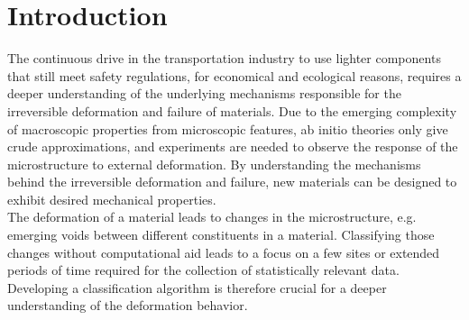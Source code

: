\chapter{Introduction}

\setcounter{page}{1}

The continuous drive in the transportation industry to use lighter components that still meet safety regulations, for economical and ecological reasons, requires a deeper understanding of the underlying mechanisms responsible for the irreversible deformation and failure of materials. Due to the emerging complexity of macroscopic properties from microscopic features, ab initio theories only give crude approximations, and experiments are needed to observe the response of the microstructure to external deformation. By understanding the mechanisms behind the irreversible deformation and failure, new materials can be designed to exhibit desired mechanical properties.\\



The deformation of a material leads to changes in the microstructure, e.g. emerging voids between different constituents in a material. Classifying those changes without computational aid leads to a focus on a few sites or extended periods of time required for the collection of statistically relevant data. Developing a classification algorithm is therefore crucial for a deeper understanding of the deformation behavior. \\

